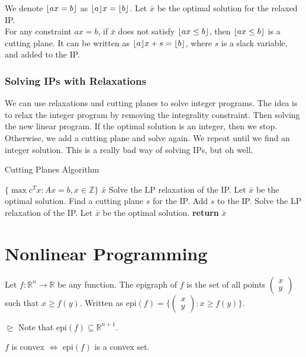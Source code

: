 \documentclass[a4paper]{report}
\newcommand{\m}[1]{\begin{pmatrix}
	#1
\end{pmatrix}}
\DeclarePairedDelimiter{\floor}{\lfloor}{\rfloor}
\begin{document}
	\begin{definition}
		We denote $\floor{ax = b}$ as $\floor{a}x = \floor{b}$. Let $\bar x$ be the
		optimal solution for the relaxed IP. \\ For any constraint $ax = b$, if
		$\bar x$ does not satisfy $\floor{ax \leq b}$, then $\floor{ax \leq b}$ is a
		cutting plane. It can be written as $\floor{a}x + s = \floor{b}$, where $s$ is
		a slack variable, and added to the IP.
	\end{definition}

	\subsection{Solving IPs with Relaxations}
	We can use relaxations and cutting planes to solve integer programs. The idea
	is to relax the integer program by removing the integrality constraint. Then solving
	the new linear program. If the optimal solution is an integer, then we stop.
	Otherwise, we add a cutting plane and solve again. We repeat until we find an
	integer solution. This is a really bad way of solving IPs, but oh well.

	\begin{algorithm}
		 \algrenewcommand{}
		\algrenewcommand{}
		\caption{Cutting Planes Algorithm}
		\label{alg:cut}
		\begin{algorithmic}
			[1] \Require $\{\max c^{T}x : Ax = b, x \in \mathbb{Z}\}$ \Ensure $\bar x$
			\State Solve the LP relaxation of the IP. Let $\bar x$ be the optimal
			solution.  \State Find a cutting plane $s$
			for the IP. \State Add $s$ to the IP. \State Solve the LP relaxation of
			the IP. Let $\bar x$ be the optimal solution. \EndWhile \State \textbf{return}
			$\bar x$
		\end{algorithmic}
	\end{algorithm}

	\chapter{Nonlinear Programming}

    \begin{definition}[Epigraphs]
        Let $f : \mathbb{R}^{n} \rightarrow \mathbb{R}$ be any function. The
        epigraph of $f$ is the set of all points $\m{x \\ y}$ such that $x \geq f(y)$.
        Written as $\text{epi}(f) = \Bigg\{\m{x \\ y} : x \geq f(y)\Bigg\}$. 
        
        $\trianglerighteq$ Note that $\text{epi}(f) \subseteq \mathbb{R}^{n+1}$.
        \begin{corollary}
            $f$ is convex $\iff$ $\text{epi}(f)$ is a convex set.
        \end{corollary}
    \end{definition}
\end{document}
